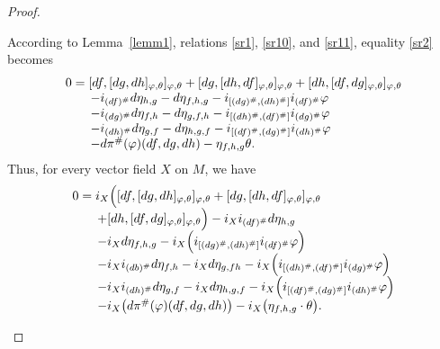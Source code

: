 \documentclass[a4paper,10pt]{article}
\numberwithin{equation}{section}
\theoremstyle{plain}
\begin{document}
\begin{proof}
\begin{itemize}
				According to Lemma~\ref{lemm1},  relations \eqref{sr1}, \eqref{sr10}, and  \eqref{sr11},  equality \eqref{sr2} becomes
				\begin{equation}\label{sr6}
					\begin{array}{l}
						 0=[df,[dg,dh]_{\varphi,\theta}]_{\varphi,\theta}+[dg,[dh,df]_{\varphi,\theta}]_{\varphi,\theta}+[dh,[df,dg]_{\varphi,\theta}]_{\varphi,\theta}\\
						\hspace{0.7cm}-i_{(df)^{\#}}d\eta_{h,g}-d\eta_{f,h,g}-i_{[(dg)^{\#},(dh)^{\#}]}i_{(df)^{\#}}\varphi\\
						\hspace{0.7cm}- i_{(dg)^{\#}}d\eta_{f,h}-d\eta_{g,f,h}-i_{[(dh)^{\#},(df)^{\#}]}i_{(dg)^{\#}}\varphi\\
						\hspace{0.7cm}-i_{(dh)^{\#}}d\eta_{g,f}-d\eta_{h,g,f}-i_{[(df)^{\#},(dg)^{\#}]}i_{(dh)^{\#}}\varphi\\
						\hspace{0.7cm}-d\pi^{\#}(\varphi)(df,dg,dh)-\eta_{f,h,g}\theta.
					\end{array}
				\end{equation}
				Thus, for every  vector field $X$ on $M$, we have	
				\begin{equation}
					\begin{array}{l}
						0=i_{X}\Big([df,[dg,dh]_{\varphi,\theta}]_{\varphi,\theta}+[dg,[dh,df]_{\varphi,\theta}]_{\varphi,\theta}\\
						\hspace{0.7cm}+[dh,[df,dg]_{\varphi,\theta}]_{\varphi,\theta} \Big)-i_{X}i_{(df)^{\#}}d\eta_{h,g} \\
						\hspace{0.7cm}-i_{X}d\eta_{f,h,g}-i_{X}\Big(i_{[(dg)^{\#},(dh)^{\#}]}i_{(df)^{\#}}\varphi\Big)\\
						\hspace{0.7cm}- i_{X}i_{(db)^{\#}}d\eta_{f,h}-i_{X}d\eta_{g,fh}-i_{X}\Big(i_{[(dh)^{\#},(df)^{\#}]}i_{(dg)^{\#}}\varphi\Big)\\
						 \hspace{0.7cm}-i_{X}i_{(dh)^{\#}}d\eta_{g,f}-i_{X}d\eta_{h,g,f}-i_{X}\Big(i_{[(df)^{\#},(dg)^{\#}]}i_{(dh)^{\#}}\varphi\Big)\\
						\hspace{0.7cm}-i_{X}\big(d\pi^{\#}(\varphi)(df,dg,dh)\big)-i_{X}\big(\eta_{f,h,g}\cdot\theta\big).
					\end{array}\label{sr7}	
				\end{equation}

\end{itemize}
\end{proof}
\end{document}
